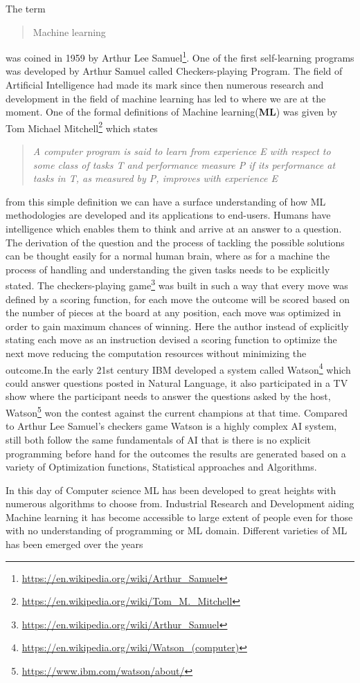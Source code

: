 The term \blockquote{Machine learning} was coined in 1959 by Arthur Lee Samuel\footnote{\url{https://en.wikipedia.org/wiki/Arthur_Samuel}}. One of the first self-learning programs was developed by Arthur Samuel called Checkers-playing Program. The field of Artificial Intelligence had made its mark since then numerous research and development in the field of machine learning has led to where we are at the moment. One of the formal definitions of Machine learning(\textbf{ML}) was given by Tom Michael Mitchell\footnote{\url{https://en.wikipedia.org/wiki/Tom_M._Mitchell}} which states \blockquote{\textit{A computer program is said to learn from experience E with respect to some class of tasks T and performance measure P if its performance at tasks in T, as measured by P, improves with experience E}} from this simple definition we can have a surface understanding of how ML methodologies are developed and its applications to end-users. Humans have intelligence which enables them to think and arrive at an answer to a question. The derivation of the question and the process of tackling the possible solutions can be thought easily for a normal human brain, where as for a machine the process of handling and understanding the given tasks needs to be explicitly stated. The checkers-playing game\footnote{\url{https://en.wikipedia.org/wiki/Arthur_Samuel}} was built in such a way that every move was defined by a scoring function, for each move the outcome will be scored based on the number of pieces at the board at any position, each move was optimized in order to gain maximum chances of winning. Here the author instead of explicitly stating each move as an instruction devised a scoring function to optimize the next move reducing the computation resources without minimizing the outcome.In the early 21st century IBM developed a system called Watson\footnote{\url{https://en.wikipedia.org/wiki/Watson_(computer)}} which could answer questions posted in Natural Language, it also participated in a TV show where the participant needs to answer the questions 
asked by the host, Watson\footnote{\url{https://www.ibm.com/watson/about/}} won the contest against the current champions at that time. Compared to Arthur Lee Samuel's checkers game Watson is a highly complex AI system, still both follow the same fundamentals of AI that is there is no explicit programming before hand for the outcomes the results are generated based on a variety of Optimization functions, Statistical approaches and Algorithms. 

In this day of Computer science ML has been developed to great heights with numerous algorithms to choose from. Industrial Research and Development aiding Machine learning it has become accessible to large extent of people even for those with no understanding of programming or ML domain. Different varieties of ML has been emerged over the years  


